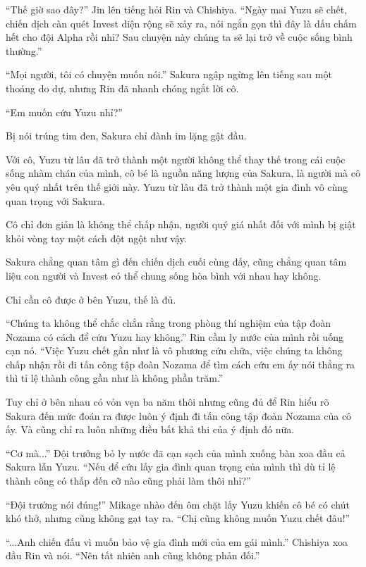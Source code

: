 {``Thế giờ sao đây?'' Jin lên tiếng hỏi Rin và Chishiya. ``Ngày mai Yuzu
sẽ chết, chiến dịch càn quét Invest diện rộng sẽ xảy ra, nói ngắn gọn
thì đây là dấu chấm hết cho đội Alpha rồi nhỉ? Sau chuyện này chúng ta
sẽ lại trở về cuộc sống bình thường.''

``Mọi người, tôi có chuyện muốn nói.'' Sakura ngập ngừng lên tiếng sau
một thoáng do dự, nhưng Rin đã nhanh chóng ngắt lời cô.

``Em muốn cứu Yuzu nhỉ?''

Bị nói trúng tim đen, Sakura chỉ đành im lặng gật đầu.

Với cô, Yuzu từ lâu đã trở thành một người không thể thay thế trong cái
cuộc sống nhàm chán của mình, cô bé là nguồn năng lượng của Sakura, là
người mà cô yêu quý nhất trên thế giới này. Yuzu từ lâu đã trở thành một
gia đình vô cùng quan trọng với Sakura.

Cô chỉ đơn giản là không thể chấp nhận, người quý giá nhất đối với mình
bị giật khỏi vòng tay một cách đột ngột như vậy.

Sakura chẳng quan tâm gì đến chiến dịch cuối cùng đấy, cũng chẳng quan
tâm liệu con người và Invest có thể chung sống hòa bình với nhau hay
không.

Chỉ cần cô được ở bên Yuzu, thế là đủ.

``Chúng ta không thể chắc chắn rằng trong phòng thí nghiệm của tập đoàn
Nozama có cách để cứu Yuzu hay không.'' Rin cầm ly nước của mình rồi
uống cạn nó. ``Việc Yuzu chết gần như là vô phương cứu chữa, việc chúng
ta không chấp nhận rồi đi tấn công tập đoàn Nozama để tìm cách cứu em ấy
nói thẳng ra thì tỉ lệ thành công gần như là không phần trăm.''

Tuy chỉ ở bên nhau có vỏn vẹn ba năm thôi nhưng cũng đủ để Rin hiểu rõ
Sakura đến mức đoán ra được luôn ý định đi tấn công tập đoàn Nozama của
cô ấy. Và cũng chỉ ra luôn những điều bất khả thi của ý định đó nữa.

``Cơ mà...'' Đội trưởng bỏ ly nước đã cạn sạch của mình xuống bàn xoa
đầu cả Sakura lẫn Yuzu. ``Nếu để cứu lấy gia đình quan trọng của mình
thì dù tỉ lệ thành công có thấp đến cỡ nào cũng phải làm thôi nhỉ?''

``Đội trưởng nói đúng!'' Mikage nhào đến ôm chặt lấy Yuzu khiến cô bé có
chút khó thở, nhưng cũng không gạt tay ra. ``Chị cũng không muốn Yuzu
chết đâu!''

``...Anh chiến đấu vì muốn bảo vệ gia đình mới của em gái mình.''
Chishiya xoa đầu Rin và nói. ``Nên tất nhiên anh cũng không phản đối.''

}
